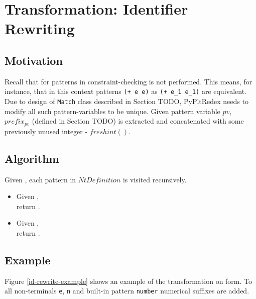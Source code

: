 \section{Transformation: Identifier Rewriting}

\subsection{Motivation}

Recall that for patterns in \DefineLanguageNoArg constraint-checking is not performed. This means, for instance, that in this context patterns \texttt{(+ e e)} as \texttt{(+ e\_1 e\_1)} are equivalent. Due to design of \texttt{Match} class described in Section TODO, PyPltRedex needs to modify all such pattern-variables to be unique. Given pattern variable $pv$, $prefix_{pv}$ (defined in Section TODO) is extracted and concatenated with some previously unused integer - $freshint()$. 

\subsection{Algorithm}
Given , each pattern in $NtDefinition$ is visited recursively.
\begin{itemize}
\item Given \BuiltInPattern, \\ return .
\item Given \NonTerminal, \\ return .
\end{itemize}

\subsection{Example}

Figure \ref{id-rewrite-example} shows an example of the transformation on \DefineLanguage form. To all non-terminals \texttt{e}, \texttt{n} and built-in pattern \texttt{number} numerical suffixes are added.

